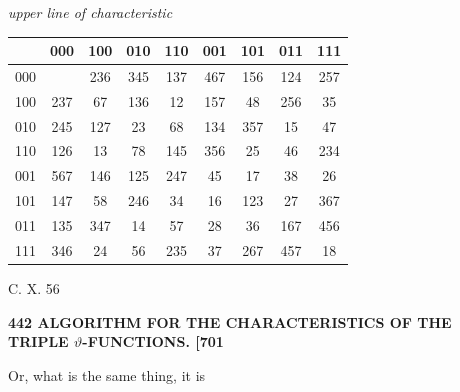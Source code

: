 \documentclass[11pt]{article}
\begin{document}
\medskip

\begin{center}
\textit{upper line of characteristic}\\[2pt]
\begin{tabular}{|c||c|c|c|c|c|c|c|c|}
\hline
 & 000 & 100 & 010 & 110 & 001 & 101 & 011 & 111 \\
\hline\hline
000 &     & 236 & 345 & 137 & 467 & 156 & 124 & 257 \\
\hline
100 & 237 & 67  & 136 & 12  & 157 & 48  & 256 & 35 \\
\hline
010 & 245 & 127 & 23  & 68  & 134 & 357 & 15  & 47 \\
\hline
110 & 126 & 13  & 78  & 145 & 356 & 25  & 46  & 234 \\
\hline
001 & 567 & 146 & 125 & 247 & 45  & 17  & 38  & 26 \\
\hline
101 & 147 & 58  & 246 & 34  & 16  & 123 & 27  & 367 \\
\hline
011 & 135 & 347 & 14  & 57  & 28  & 36  & 167 & 456 \\
\hline
111 & 346 & 24  & 56  & 235 & 37  & 267 & 457 & 18 \\
\hline
\end{tabular}
\end{center}

\bigskip

\hfill C. X. \hfill 56

\bigskip
\noindent\textbf{442 \hfill ALGORITHM FOR THE CHARACTERISTICS OF THE TRIPLE $\vartheta$-FUNCTIONS. \hfill [701}

\medskip

Or, what is the same thing, it is

\medskip
\end{document}
